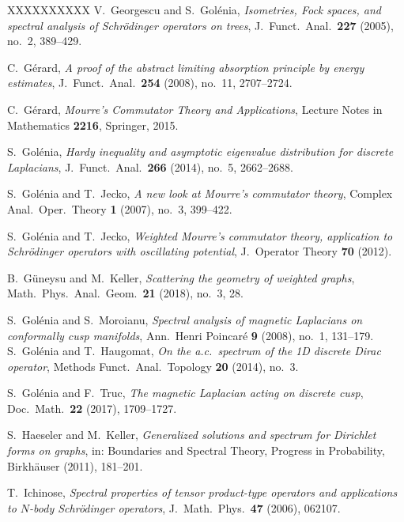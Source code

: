 \documentclass[10pt]{amsart} %
\newcommand{\1}{{\mathbb{I}}}
\numberwithin{equation}{section}
\begin{document}
\begin{thebibliography}{XXXXXXXXXX}
 V.\ Georgescu and S.\ Gol\'enia, \emph{Isometries, Fock spaces, and spectral analysis of Schr\"odinger operators on trees}, J.\ Funct.\ Anal.\ {\bf 227} (2005), no.\ 2, 389--429.

 C.\ G\'erard, \emph{A proof of the abstract limiting absorption principle by energy estimates}, J.\ Funct.\ Anal.\ {\bf 254} (2008), no.\ 11, 2707--2724.

 C.\ G\'erard, \emph{Mourre's Commutator Theory and Applications}, Lecture Notes in Mathematics {\bf 2216}, Springer, 2015.

 S.\ Gol\'enia, \emph{Hardy inequality and asymptotic eigenvalue distribution for discrete Laplacians}, J.\ Funct.\ Anal.\ {\bf 266} (2014), no.\ 5, 2662--2688.

 S.\ Gol\'enia and T.\ Jecko, \emph{A new look at Mourre's commutator theory}, Complex Anal.\ Oper.\ Theory {\bf 1} (2007), no.\ 3, 399--422.

 S.\ Gol\'enia and T.\ Jecko, \emph{Weighted Mourre's commutator theory, application to Schr\"odinger operators with oscillating potential}, J.\ Operator Theory {\bf 70} (2012).

 B.\ G{\"u}neysu and M.\ Keller, \emph{Scattering the geometry of weighted graphs}, Math.\ Phys.\ Anal.\ Geom.\ {\bf 21} (2018), no.\ 3, 28.

 S.\ Gol\'enia and S.\ Moroianu, \emph{Spectral analysis of magnetic Laplacians on conformally cusp manifolds}, Ann.\ Henri Poincar\'e {\bf 9} (2008), no.\ 1, 131--179.
 S.\ Gol\'enia and T.\ Haugomat, \emph{On the a.c.\ spectrum of the 1D discrete Dirac operator}, Methods Funct.\ Anal.\ Topology {\bf 20} (2014), no.\ 3.

 S.\ Gol\'enia and F.\ Truc, \emph{The magnetic Laplacian acting on discrete cusp}, Doc.\ Math.\ {\bf 22} (2017), 1709--1727.

 S.\ Haeseler and M.\ Keller, \emph{Generalized solutions and spectrum for Dirichlet forms on graphs}, in: Boundaries and Spectral Theory, Progress in Probability, Birkh\"auser (2011), 181--201.


 T.\ Ichinose, \emph{Spectral properties of tensor product-type operators and applications to $N$-body Schr\"odinger operators}, J.\ Math.\ Phys.\ {\bf 47} (2006), 062107.


\end{thebibliography}
\end{document}
